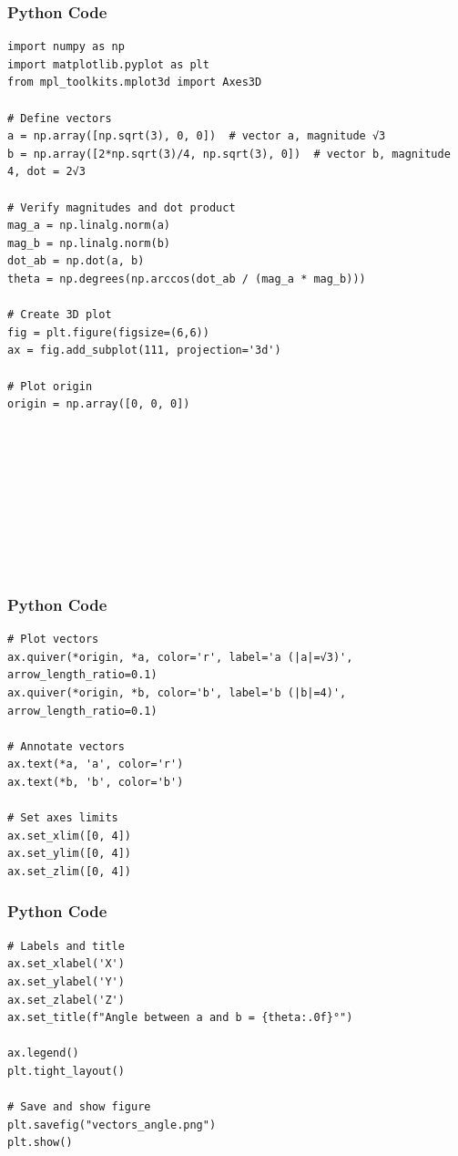 \documentclass{beamer}
\begin{document}
\begin{frame}[fragile]
    \frametitle{Python Code}
    \begin{lstlisting}
import numpy as np
import matplotlib.pyplot as plt
from mpl_toolkits.mplot3d import Axes3D

# Define vectors
a = np.array([np.sqrt(3), 0, 0])  # vector a, magnitude √3
b = np.array([2*np.sqrt(3)/4, np.sqrt(3), 0])  # vector b, magnitude 4, dot = 2√3

# Verify magnitudes and dot product
mag_a = np.linalg.norm(a)
mag_b = np.linalg.norm(b)
dot_ab = np.dot(a, b)
theta = np.degrees(np.arccos(dot_ab / (mag_a * mag_b)))

# Create 3D plot
fig = plt.figure(figsize=(6,6))
ax = fig.add_subplot(111, projection='3d')

# Plot origin
origin = np.array([0, 0, 0])










    \end{lstlisting}
\end{frame}

\begin{frame}[fragile]
    \frametitle{Python Code}
    \begin{lstlisting}
# Plot vectors
ax.quiver(*origin, *a, color='r', label='a (|a|=√3)', arrow_length_ratio=0.1)
ax.quiver(*origin, *b, color='b', label='b (|b|=4)', arrow_length_ratio=0.1)

# Annotate vectors
ax.text(*a, 'a', color='r')
ax.text(*b, 'b', color='b')

# Set axes limits
ax.set_xlim([0, 4])
ax.set_ylim([0, 4])
ax.set_zlim([0, 4])

    \end{lstlisting}
\end{frame}

\begin{frame}[fragile]
    \frametitle{Python Code}
    \begin{lstlisting}
# Labels and title
ax.set_xlabel('X')
ax.set_ylabel('Y')
ax.set_zlabel('Z')
ax.set_title(f"Angle between a and b = {theta:.0f}°")

ax.legend()
plt.tight_layout()

# Save and show figure
plt.savefig("vectors_angle.png")
plt.show()


    \end{lstlisting}
\end{frame}
\end{document}
